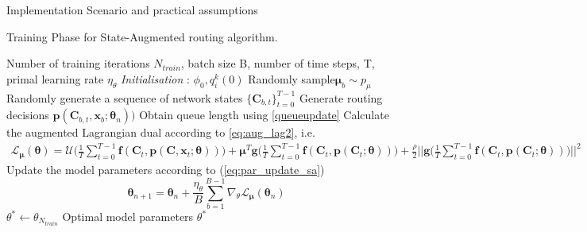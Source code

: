 \documentclass[lettersize,journal]{IEEEtran}
\begin{document}
\begin{subsection}{Implementation Scenario and practical assumptions}
\begin{algorithm*}%
\caption{Training Phase for State-Augmented routing algorithm.}
\label{alg:alg1}
\begin{algorithmic}[1]
 \renewcommand{\algorithmicrequire}{\textbf{Input:}}
 \REQUIRE Number of training iterations $N_{train}$, batch size B, number of time steps, T, primal learning rate $\eta_\theta$
\STATE \textit{Initialisation} : $\phi_0, q_i^k(0)$ 
\STATE Randomly sample$\bm{\mu}_b \sim p_{\mu}$
\STATE Randomly generate a sequence of network states $\{\mathbf{C}_{b,t} \}_{t=0}^{T-1}$
\STATE Generate routing decisions $\mathbf{p}(\mathbf{C}_{b,t},\mathbf{x}_b;\bm{\theta}_n))$
\STATE Obtain queue length using \eqref{queueupdate}
\ENDFOR
\STATE Calculate the augmented Lagrangian dual according to \eqref{eq:aug_lag2}, i.e.
\begin{multline*}
    \mathcal{L}_{\bm{\mu}}(\bm{\theta}) = \mathcal{U} \Biggl(\frac{1}{T} \sum_{t=0}^{T-1} \mathbf{f}(\mathbf{C}_t, \mathbf{p}(\mathbf{C}, \mathbf{x}_t;\bm{\theta}))\Biggl) 
    + \bm{\mu}^T  \mathbf{g}\Biggl(\frac{1}{T} \sum_{t=0}^{T-1} \mathbf{f}(\mathbf{C}_t, \mathbf{p}(\mathbf{C}_t;\bm{\theta})) \Biggl) 
    + \frac{\rho}{2} \Biggl|\!\Biggl| \mathbf{g}\Biggl(\frac{1}{T} \sum_{t=0}^{T-1} \mathbf{f}(\mathbf{C}_t, \mathbf{p}(\mathbf{C}_t;\bm{\theta})) \Biggl) \Biggr|\!\Biggr|^2
\end{multline*}
\ENDFOR
\STATE Update the model parameters according to (\ref{eq:par_update_sa})
\begin{equation*}
    \bm{\theta}_{n+1} = \bm{\theta}_{n} + \frac{\eta_\theta}{B} \sum_{b=1}^{B-1} \nabla_\theta \mathcal{L}_{\bm{\mu}} (\bm{\theta}_n)
\end{equation*}
\ENDFOR
\STATE $\theta^* \leftarrow \theta_{N_{train}}$
\renewcommand{\algorithmicrequire}{\textbf{Output:}}
 \REQUIRE Optimal model parameters $\theta^*$
\end{algorithmic}
\end{algorithm*}


\end{subsection}
\end{document}
